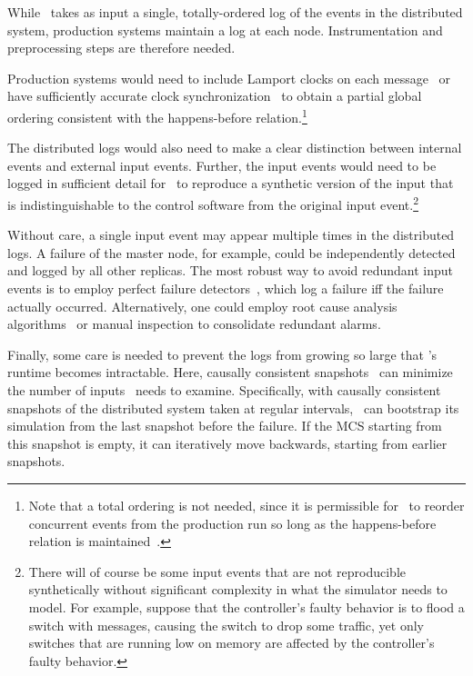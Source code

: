 While \simulator~takes as input a single, totally-ordered log of the events in the
distributed system, production systems maintain a log at each node.
Instrumentation and preprocessing steps are therefore needed.

Production systems would need to include Lamport
clocks on each message~\cite{Lamport:1978:TCO:359545.359563} or have
sufficiently accurate clock
synchronization~\cite{corbett2012spanner} to obtain a partial global ordering
consistent with the happens-before relation.\footnote{
Note that a total ordering is not needed, since it is permissible
for \simulator~to reorder concurrent events from
the production run so long as the happens-before relation is
maintained~\cite{Fischer:1985:IDC:3149.214121}.}

The distributed logs would also need to make a clear distinction between
internal events and external input events. Further,
the input events would need to be logged in sufficient detail for \projectname~to
reproduce a synthetic version of the input that is indistinguishable to the control software
from the original input event.\footnote{There will of course be some input events that
are not reproducible
synthetically without significant complexity in what the simulator needs to model.
For example, suppose that the controller's faulty behavior is to flood a switch with messages,
causing the switch to drop some traffic, yet only switches that are running low on memory
are affected by the controller's faulty behavior.}

Without care, a single input event may appear multiple times in the
distributed logs. A failure of the master node, for example, could be independently
detected and logged by all other replicas. The most robust way to
avoid redundant input events is to employ perfect failure
detectors~\cite{chandra1996unreliable}, which log a failure iff
the failure actually occurred. %
Alternatively, one
could employ root cause analysis
algorithms~\cite{yemini1996} or manual inspection to consolidate redundant
alarms.

Finally, some care is needed to prevent the logs from growing so large that
\simulator's runtime becomes intractable. Here, causally consistent
snapshots~\cite{Chandy:1985:DSD:214451.214456} can minimize the number of inputs \simulator~needs
to examine. Specifically, with causally consistent snapshots of the distributed
system taken at regular intervals, \projectname~can bootstrap its simulation from the last snapshot before the failure.
If the MCS starting from this snapshot is empty, it can iteratively move backwards, starting from earlier
snapshots.

